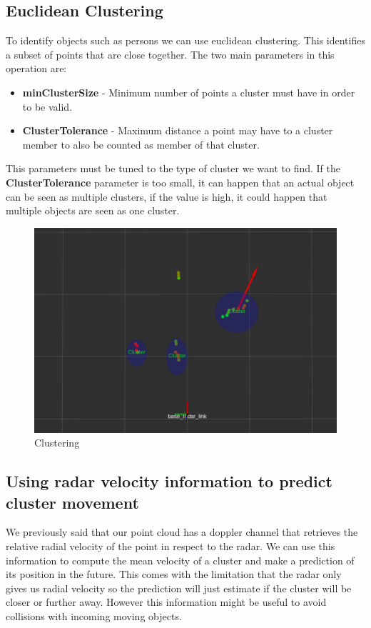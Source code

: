 \documentclass[12pt]{article}
\begin{document}
\subsection{Euclidean Clustering}
To identify objects such as persons we can use euclidean clustering. This identifies a subset of points that are close together. The two main parameters in this operation are:
\begin{itemize}
\item \textbf{minClusterSize} - Minimum number of points a cluster must have in order to be valid.
\item \textbf{ClusterTolerance}  - Maximum distance a point may have to a cluster member to also be counted as member of that cluster.
\end{itemize}
This parameters must be tuned to the type of cluster we want to find. 
If the \textbf{ClusterTolerance} parameter is too small, it can happen that an actual object can be seen as multiple clusters, if the value is high, it could happen that multiple objects are seen as one cluster.
\begin{figure}[!htb]
    \centering
    \includegraphics[width=\linewidth]{cluster.png}
    \caption{Clustering}
    \label{fig:clustering}
\end{figure}
\subsection{Using radar velocity information to predict cluster movement}
We previously said that our point cloud has a doppler channel that retrieves the relative radial velocity of the point in respect to the radar. We can use this information to compute the mean velocity of a cluster and make a prediction of its position in the future. This comes with the limitation that the radar only gives us radial velocity so the prediction will just estimate if the cluster will be closer or further away. 
However this information might be useful to avoid collisions with incoming moving objects.
\end{document}

